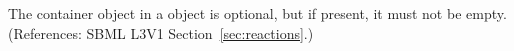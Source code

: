 \removedRule
  {The \ListOfLocalParameters container object in a \KineticLaw object is optional, but if present, it must not be empty.}
  {(References: SBML L3V1 Section~\ref{sec:reactions}.)}

